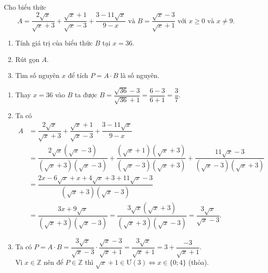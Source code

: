 \begin{ex}%
	Cho biểu thức 
	\begin{equation*}
		A =\dfrac{2\sqrt{x}}{\sqrt{x} + 3} + \dfrac{\sqrt{x} + 1}{\sqrt{x} - 3} + \dfrac{3 - 11\sqrt{x}}{9 - x} \text{ và } B =\dfrac{\sqrt{x} - 3}{\sqrt{x} + 1} \text{ với } x \ge 0 \text{ và } x \ne 9.
	\end{equation*}
	\begin{enumerate}
		\item Tính giá trị của biểu thức $B$ tại $x = 36.$
		\item Rút gọn $A.$
		\item Tìm số nguyên $x$ để tích $P = A \cdot B$ là số nguyên.
	\end{enumerate}
	\loigiai
	{
		\begin{enumerate}
			\item Thay $x = 36$ vào $B$ ta được $B = \dfrac{\sqrt{36} - 3}{\sqrt{36}+1} = \dfrac{6-3}{6+1} = \dfrac{3}{7}$.
			\item Ta có
				\begin{align*}
					A &= \dfrac{2\sqrt{x}}{\sqrt{x} + 3} + \dfrac{\sqrt{x} + 1}{\sqrt{x} - 3} + \dfrac{3 - 11\sqrt{x}}{9 - x}\\
					&= \dfrac{2\sqrt{x}\left(\sqrt{x}-3\right)}{\left(\sqrt{x}+3\right)\left(\sqrt{x}-3\right)} + \dfrac{\left(\sqrt{x}+1\right)\left(\sqrt{x}+3\right)}{\left(\sqrt{x}-3\right)\left(\sqrt{x}+3\right)} + \dfrac{11\sqrt{x} - 3}{\left(\sqrt{x}-3\right)\left(\sqrt{x}+3\right)}\\
					&=\dfrac{2x - 6\sqrt{x} + x + 4\sqrt{x} + 3 + 11\sqrt{x} - 3}{(\sqrt{x} + 3)(\sqrt{x} - 3)}\\
					&=\dfrac{3x + 9\sqrt{x}}{(\sqrt{x} + 3)(\sqrt{x} - 3)}=\dfrac{3\sqrt{x}(\sqrt{x} + 3)}{(\sqrt{x} + 3)(\sqrt{x} - 3)}=\dfrac{3\sqrt{x}}{\sqrt{x} - 3}.
				\end{align*}
			\item Ta có
			$P = A\cdot B =\dfrac{3\sqrt{x}}{\sqrt{x} - 3}\cdot\dfrac{\sqrt{x} - 3}{\sqrt{x} + 1}=\dfrac{3\sqrt{x}}{\sqrt{x} + 1}= 3 + \dfrac{ - 3}{\sqrt{x} + 1}$.\\
			Vì $x \in \mathbb{Z}$ nên để $P \in \mathbb{Z}$ thì $\sqrt{x}+1 \in \textrm{Ư}(3) \Leftrightarrow x \in \{0;4\}$ (thỏa).
		\end{enumerate}
	}
\end{ex}


